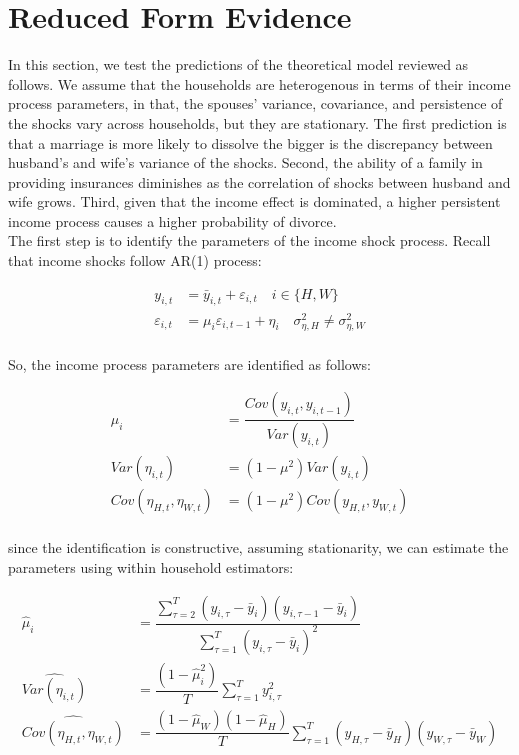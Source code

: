 \section{Reduced Form Evidence}

In this section, we test the predictions of the theoretical model reviewed as follows. We assume that the households are heterogenous in terms of their income process parameters, in that, the spouses' variance, covariance, and persistence of the shocks vary across households, but they are stationary. The first prediction is that a marriage is more likely to dissolve the bigger is the discrepancy between husband's and wife's variance of the shocks. Second, the ability of a family in providing insurances diminishes as the correlation of shocks between husband and wife grows. Third, given that the income effect is dominated, a higher persistent income process causes a higher probability of divorce. \\

The first step is to identify the parameters of the income shock process. Recall that income shocks follow AR(1) process:

\begin{align*}
y_{i,t} &= \bar y_{i,t} + \varepsilon_{i,t} \quad  i \in \{H,W\} \\
\varepsilon_{i,t} & = \mu_i \varepsilon_{i, t-1} + \eta_{i} \quad \sigma^2_{\eta,H}\neq \sigma^2_{\eta,W}\\
\end{align*}

\noindent So, the income process parameters are identified as follows: 

\begin{align*}
\mu_i &= \dfrac{Cov(y_{i,t}, y_{i, t-1})}{Var(y_{i,t})}  \\
Var(\eta_{i,t}) &= (1 - \mu^2) Var(y_{i,t})\\
Cov(\eta_{H,t},\eta_{W,t}) &= (1 - \mu^2 ) Cov(y_{H,t}, y_{W,t}) \\
\end{align*}

\noindent since the identification is constructive, assuming stationarity, we can estimate the parameters using within household estimators:

\begin{align*}
\hat \mu_i &= \dfrac{\sum \limits_{\tau = 2}^{T} (y_{i,\tau} - \bar y_i) (y_{i, \tau-1} - \bar y_i)}{\sum \limits_{\tau = 1}^{T} (y_{i,\tau} - \bar y_i)^2} \\
\widehat{Var(\eta_{i,t})} &= \dfrac{(1 - \hat \mu_i^2)}{T} \sum \limits _{\tau = 1}^T y^2_{i,\tau}\\
\widehat {Cov(\eta_{H,t},\eta_{W,t})} &= \dfrac{(1 - \hat \mu_W)(1 - \hat \mu_H)}{T} \sum \limits_{\tau =1}^T (y_{H,\tau} - \bar y_H) (y_{W,\tau} - \bar y_W)\\
\end{align*}

